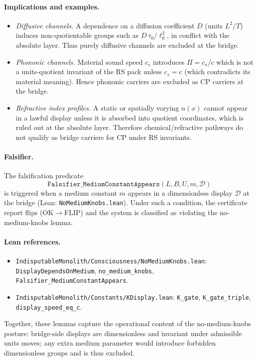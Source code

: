\documentclass[12pt,a4paper]{article}
\begin{document}
\paragraph{Implications and examples.}
\begin{itemize}
  \item \emph{Diffusive channels.} A dependence on a diffusion coefficient \(D\) (units \(L^2/T\)) induces non-quotientable groups such as \(D\,\tau_0/\ell_0^2\), in conflict with the absolute layer. Thus purely diffusive channels are excluded at the bridge.
  \item \emph{Phononic channels.} Material sound speed \(c_s\) introduces \(\Pi = c_s/c\) which is not a units-quotient invariant of the RS pack unless \(c_s=c\) (which contradicts its material meaning). Hence phononic carriers are excluded as CP carriers at the bridge.
  \item \emph{Refractive index profiles.} A static or spatially varying \(n(x)\) cannot appear in a lawful display unless it is absorbed into quotient coordinates, which is ruled out at the absolute layer. Therefore chemical/refractive pathways do not qualify as bridge carriers for CP under RS invariants.
\end{itemize}

\paragraph{Falsifier.}
The falsification predicate
\[
  \texttt{Falsifier\_MediumConstantAppears}(L,B,U,m,\mathcal{D})
\]
is triggered when a medium constant \(m\) appears in a dimensionless display \(\mathcal{D}\) at the bridge (Lean: \texttt{NoMediumKnobs.lean}). Under such a condition, the certificate report flips (OK\(\rightarrow\)FLIP) and the system is classified as violating the no-medium-knobs lemma.

\paragraph{Lean references.}
\begin{itemize}
  \item \texttt{IndisputableMonolith/Consciousness/NoMediumKnobs.lean}:
    \texttt{DisplayDependsOnMedium}, \texttt{no\_medium\_knobs}, \texttt{Falsifier\_MediumConstantAppears}.
  \item \texttt{IndisputableMonolith/Constants/KDisplay.lean}: \texttt{K\_gate}, \texttt{K\_gate\_triple}, \texttt{display\_speed\_eq\_c}.
\end{itemize}
Together, these lemmas capture the operational content of the no-medium-knobs posture: bridge-side displays are dimensionless and invariant under admissible units moves; any extra medium parameter would introduce forbidden dimensionless groups and is thus excluded.
\end{document}
